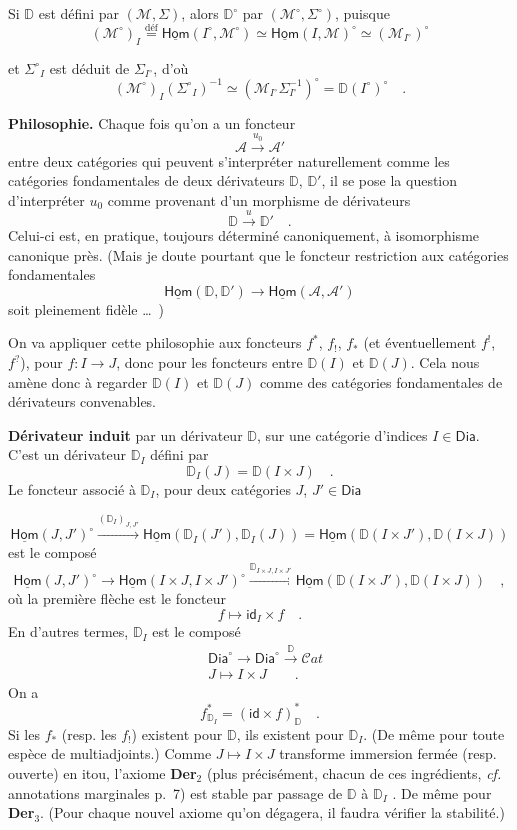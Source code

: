 \documentclass[11pt]{article}
\newcommand{\printedpage}[1]{\marginpar{\footnotesize p.~#1}}
\newcommand{\msp}[1]{\marginpar{\footnotesize [#1]}}
\newcommand{\uHom}{\underline{\mathsf{Hom}}}
\newcommand{\Dia}{\mathsf{Dia}}
\newcommand{\Cat}{\mathcal{C}\mathit{at}}
\newcommand{\DD}{\mathbb{D}}
\newcommand{\id}{\mathsf{id}}
\newcommand{\defeq}{\overset{\text{déf}}{=}}
\newcommand{\D}{\mathbb{D}}
\begin{document}
Si $\DD$ est défini par $(\mathcal{M},\Sigma)$, alors $\DD^\circ$ par $(\mathcal{M}^\circ,\Sigma^\circ)$, puisque
\[
(\mathcal{M}^\circ)_I \defeq \uHom(I^\circ,\mathcal{M}^\circ) \simeq \uHom(I,\mathcal{M})^\circ \simeq (\mathcal{M}_{I^\circ})^\circ
\]

\printedpage{14}

et $\Sigma^\circ{}_I$ est déduit de $\Sigma_{I^\circ}$, d'où
\[
(\mathcal{M}^\circ)_I(\Sigma^\circ{}_I)^{-1} \simeq (\mathcal{M}_{I^\circ}\Sigma_{I^\circ}^{-1})^\circ = \D(I^\circ)^\circ \quad .
\]

\msp{page 18}

\textbf{Philosophie.} Chaque fois qu'on a un foncteur
\[
\mathcal{A} \xrightarrow{u_0} \mathcal{A}'
\]
entre deux catégories qui peuvent s'interpréter naturellement comme les catégories fondamentales de deux dérivateurs $\D$, $\D'$, il se pose la question d'interpréter $u_0$ comme provenant d'un morphisme de dérivateurs
\[
\D \xrightarrow{u} \D' \quad .
\]
Celui-ci est, en pratique, toujours déterminé canoniquement, à isomorphisme canonique près. (Mais je doute pourtant que le foncteur restriction aux catégories fondamentales
\[
\uHom(\D,\D') \longrightarrow \uHom(\mathcal{A},\mathcal{A}')
\]
soit pleinement fidèle \dots\ )

On va appliquer cette philosophie aux foncteurs $f^*$, $f_!$, $f_*$ (et éventuellement $f^!$, $f^?$), pour $f : I \to J$, donc pour les foncteurs entre $\D(I)$ et $\D(J)$. Cela nous amène donc à regarder $\D(I)$ et $\D(J)$ comme des catégories fondamentales de dérivateurs convenables.

\textbf{Dérivateur induit} par un dérivateur $\D$, sur une catégorie d'indices $I \in \Dia$. C'est un dérivateur $\D_I$ défini par
\[
\D_I(J) = \D(I \times J) \quad .
\]
Le foncteur associé à $\D_I$, pour deux catégories $J$, $J' \in \Dia$

\msp{page 19}
\[
\uHom(J,J')^\circ \xrightarrow{(\D_I)_{J,J'}} \uHom(\D_I(J'),\D_I(J)) = \uHom(\D(I\times J'),\D(I\times J))
\]
est le composé
\[
\uHom(J,J')^\circ \longrightarrow \uHom(I\times J, I\times J')^\circ \xrightarrow{\D_{I\times J,I\times J'}} \uHom(\D(I\times J'),\D(I\times J)) \quad ,
\]
où la première flèche est le foncteur
\[
f \longmapsto \id_I \times f \quad .
\]
En d'autres termes, $\D_I$ est le composé
\[
\begin{aligned}
&\Dia^\circ \longrightarrow \Dia^\circ \xrightarrow{\D} \Cat \\
&J \longmapsto I \times J \qquad .
\end{aligned}
\]
On a
\[
f^*_{\D_I} = (\id \times f)^*_{\D} \quad .
\]
Si les $f_*$ (resp. les $f_!$) existent pour $\D$, ils existent pour $\D_I$. (De même pour toute espèce de multiadjoints.) Comme $J \mapsto I \times J$ transforme immersion fermée (resp. ouverte) en itou, l'axiome \textbf{Der}$_2$ (plus précisément, chacun de ces ingrédients, \textit{cf.} annotations marginales p.~7) est stable par passage de $\D$ à $\D_I$ . De même pour \textbf{Der}$_3$. (Pour chaque nouvel axiome qu'on dégagera, il faudra vérifier la stabilité.)
\end{document}
